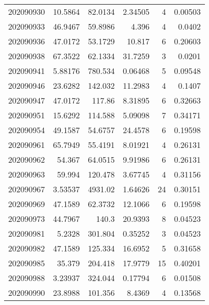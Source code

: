 \begin{tabular}{rrrrrr}
 202090930 &         10.5864  &       82.0134 &            2.34505 &           4 & 0.00503 \\
 202090933 &         46.9467  &       59.8986 &            4.396   &           4 & 0.0402  \\
 202090936 &         47.0172  &       53.1729 &           10.817   &           6 & 0.20603 \\
 202090938 &         67.3522  &       62.1334 &           31.7259  &           3 & 0.0201  \\
 202090941 &          5.88176 &      780.534  &            0.06468 &           5 & 0.09548 \\
 202090946 &         23.6282  &      142.032  &           11.2983  &           4 & 0.1407  \\
 202090947 &         47.0172  &      117.86   &            8.31895 &           6 & 0.32663 \\
 202090951 &         15.6292  &      114.588  &            5.09098 &           7 & 0.34171 \\
 202090954 &         49.1587  &       54.6757 &           24.4578  &           6 & 0.19598 \\
 202090961 &         65.7949  &       55.4191 &            8.01921 &           4 & 0.26131 \\
 202090962 &         54.367   &       64.0515 &            9.91986 &           6 & 0.26131 \\
 202090963 &         59.994   &      120.478  &            3.67745 &           4 & 0.31156 \\
 202090967 &          3.53537 &     4931.02   &            1.64626 &          24 & 0.30151 \\
 202090969 &         47.1589  &       62.3732 &           12.1066  &           6 & 0.19598 \\
 202090973 &         44.7967  &      140.3    &           20.9393  &           8 & 0.04523 \\
 202090981 &          5.2328  &      301.804  &            0.35252 &           3 & 0.04523 \\
 202090982 &         47.1589  &      125.334  &           16.6952  &           5 & 0.31658 \\
 202090985 &         35.379   &      204.418  &           17.9779  &          15 & 0.40201 \\
 202090988 &          3.23937 &      324.044  &            0.17794 &           6 & 0.01508 \\
 202090990 &         23.8988  &      101.356  &            8.4369  &           4 & 0.13568 \\

\end{tabular}
